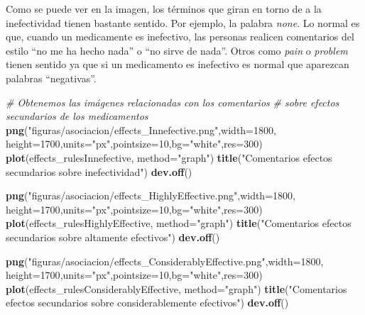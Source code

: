 \documentclass[spanish,]{article}
\newenvironment{Shaded}{\begin{snugshade}}{\end{snugshade}}
\newcommand{\KeywordTok}[1]{\textcolor[rgb]{0.13,0.29,0.53}{\textbf{#1}}}
\newcommand{\DataTypeTok}[1]{\textcolor[rgb]{0.13,0.29,0.53}{#1}}
\newcommand{\DecValTok}[1]{\textcolor[rgb]{0.00,0.00,0.81}{#1}}
\newcommand{\StringTok}[1]{\textcolor[rgb]{0.31,0.60,0.02}{#1}}
\newcommand{\CommentTok}[1]{\textcolor[rgb]{0.56,0.35,0.01}{\textit{#1}}}
\newcommand{\NormalTok}[1]{#1}
\begin{document}
Como se puede ver en la imagen, los términos que giran en torno de a la
inefectividad tienen bastante sentido. Por ejemplo, la palabra
\emph{none}. Lo normal es que, cuando un medicamente es inefectivo, las
personas realicen comentarios del estilo ``no me ha hecho nada'' o ``no
sirve de nada''. Otros como \emph{pain} o \emph{problem} tienen sentido
ya que si un medicamento es inefectivo es normal que aparezcan palabras
``negativas''.

\begin{Shaded}
\begin{Highlighting}[]
\CommentTok{# Obtenemos las imágenes relacionadas con los comentarios }
\CommentTok{# sobre efectos secundarios de los medicamentos}
\KeywordTok{png}\NormalTok{(}\StringTok{"figuras/asociacion/effects_Innefective.png"}\NormalTok{,}\DataTypeTok{width=}\DecValTok{1800}\NormalTok{,}
    \DataTypeTok{height=}\DecValTok{1700}\NormalTok{,}\DataTypeTok{units=}\StringTok{"px"}\NormalTok{,}\DataTypeTok{pointsize=}\DecValTok{10}\NormalTok{,}\DataTypeTok{bg=}\StringTok{"white"}\NormalTok{,}\DataTypeTok{res=}\DecValTok{300}\NormalTok{)}
\KeywordTok{plot}\NormalTok{(effects_rulesInnefective, }\DataTypeTok{method=}\StringTok{"graph"}\NormalTok{)}
\KeywordTok{title}\NormalTok{(}\StringTok{"Comentarios efectos secundarios sobre inefectividad"}\NormalTok{)}
\KeywordTok{dev.off}\NormalTok{()}

\KeywordTok{png}\NormalTok{(}\StringTok{"figuras/asociacion/effects_HighlyEffective.png"}\NormalTok{,}\DataTypeTok{width=}\DecValTok{1800}\NormalTok{,}
    \DataTypeTok{height=}\DecValTok{1700}\NormalTok{,}\DataTypeTok{units=}\StringTok{"px"}\NormalTok{,}\DataTypeTok{pointsize=}\DecValTok{10}\NormalTok{,}\DataTypeTok{bg=}\StringTok{"white"}\NormalTok{,}\DataTypeTok{res=}\DecValTok{300}\NormalTok{)}
\KeywordTok{plot}\NormalTok{(effects_rulesHighlyEffective, }\DataTypeTok{method=}\StringTok{"graph"}\NormalTok{)}
\KeywordTok{title}\NormalTok{(}\StringTok{"Comentarios efectos secundarios sobre altamente efectivos"}\NormalTok{)}
\KeywordTok{dev.off}\NormalTok{()}

\KeywordTok{png}\NormalTok{(}\StringTok{"figuras/asociacion/effects_ConsiderablyEffective.png"}\NormalTok{,}\DataTypeTok{width=}\DecValTok{1800}\NormalTok{,}
    \DataTypeTok{height=}\DecValTok{1700}\NormalTok{,}\DataTypeTok{units=}\StringTok{"px"}\NormalTok{,}\DataTypeTok{pointsize=}\DecValTok{10}\NormalTok{,}\DataTypeTok{bg=}\StringTok{"white"}\NormalTok{,}\DataTypeTok{res=}\DecValTok{300}\NormalTok{)}
\KeywordTok{plot}\NormalTok{(effects_rulesConsiderablyEffective, }\DataTypeTok{method=}\StringTok{"graph"}\NormalTok{)}
\KeywordTok{title}\NormalTok{(}\StringTok{"Comentarios efectos secundarios sobre considerablemente efectivos"}\NormalTok{)}
\KeywordTok{dev.off}\NormalTok{()}


\end{Highlighting}
\end{Shaded}
\end{document}
